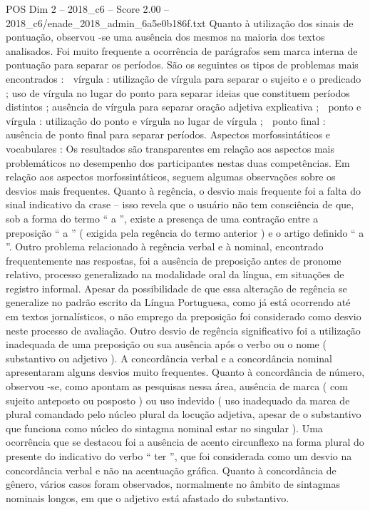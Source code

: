 \begin{textsample}{POS Dim 2 – 2018\_c6 – Score 2.00 – 2018\_c6/enade\_2018\_admin\_6a5e0b186f.txt}
Quanto à utilização dos sinais de pontuação, observou -se uma ausência dos mesmos na maioria dos textos analisados.
Foi muito frequente a ocorrência de parágrafos sem marca interna de pontuação para separar os períodos.
São os seguintes os tipos de problemas mais encontrados :  vírgula : utilização de vírgula para separar o sujeito e o predicado ; uso de vírgula no lugar do ponto para separar ideias que constituem períodos distintos ; ausência de vírgula para separar oração adjetiva explicativa ;  ponto e vírgula : utilização do ponto e vírgula no lugar de vírgula ;  ponto final : ausência de ponto final para separar períodos.
Aspectos morfossintáticos e vocabulares : Os resultados são transparentes em relação aos aspectos mais problemáticos no desempenho dos participantes nestas duas competências.
Em relação aos aspectos morfossintáticos, seguem algumas observações sobre os desvios mais frequentes.
Quanto à regência, o desvio mais frequente foi a falta do sinal indicativo da crase – isso revela que o usuário não tem consciência de que, sob a forma do termo “ a ”, existe a presença de uma contração entre a preposição “ a ” ( exigida pela regência do termo anterior ) e o artigo definido “ a ”.
Outro problema relacionado à regência verbal e à nominal, encontrado frequentemente nas respostas, foi a ausência de preposição antes de pronome relativo, processo generalizado na modalidade oral da língua, em situações de registro informal.
Apesar da possibilidade de que essa alteração de regência se generalize no padrão escrito da Língua Portuguesa, como já está ocorrendo até em textos jornalísticos, o não emprego da preposição foi considerado como desvio neste processo de avaliação.
Outro desvio de regência significativo foi a utilização inadequada de uma preposição ou sua ausência após o verbo ou o nome ( substantivo ou adjetivo ).
A concordância verbal e a concordância nominal apresentaram alguns desvios muito frequentes.
Quanto à concordância de número, observou -se, como apontam as pesquisas nessa área, ausência de marca ( com sujeito anteposto ou posposto ) ou uso indevido ( uso inadequado da marca de plural comandado pelo núcleo plural da locução adjetiva, apesar de o substantivo que funciona como núcleo do sintagma nominal estar no singular ).
Uma ocorrência que se destacou foi a ausência de acento circunflexo na forma plural do presente do indicativo do verbo “ ter ”, que foi considerada como um desvio na concordância verbal e não na acentuação gráfica.
Quanto à concordância de gênero, vários casos foram observados, normalmente no âmbito de sintagmas nominais longos, em que o adjetivo está afastado do substantivo.

\end{textsample}
